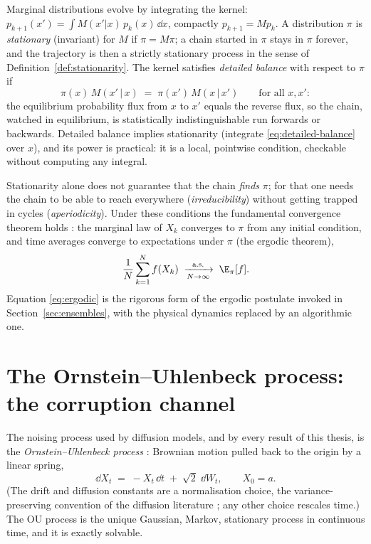 Marginal distributions evolve by integrating the kernel:
$p_{k+1}(x') = \int M(x'|x)\, p_k(x)\,\dd x$, compactly
$p_{k+1} = M p_k$. A distribution $\pi$ is \emph{stationary} (invariant)
for $M$ if $\pi = M\pi$; a chain started in $\pi$ stays in $\pi$ forever,
and the trajectory is then a strictly stationary process in the sense of
Definition~\ref{def:stationarity}. The kernel satisfies \emph{detailed
balance} with respect to $\pi$ if
\begin{equation}
  \pi(x)\, M(x' \,|\, x) \;=\; \pi(x')\, M(x \,|\, x')
  \qquad \text{for all } x, x' :
  \label{eq:detailed-balance}
\end{equation}
the equilibrium probability flux from $x$ to $x'$ equals the reverse
flux, so the chain, watched in equilibrium, is statistically
indistinguishable run forwards or backwards. Detailed balance implies
stationarity (integrate \eqref{eq:detailed-balance} over $x$), and its
power is practical: it is a local, pointwise condition, checkable without
computing any integral.

Stationarity alone does not guarantee that the chain \emph{finds} $\pi$;
for that one needs the chain to be able to reach everywhere
(\emph{irreducibility}) without getting trapped in cycles
(\emph{aperiodicity}). Under these conditions the fundamental convergence
theorem holds \citep{robert2004monte}: the marginal law of $X_k$
converges to $\pi$ from any initial condition, and time averages converge
to expectations under $\pi$ (the ergodic theorem),
\begin{equation}
  \frac{1}{N} \sum_{k=1}^{N} f(X_k)
  \;\xrightarrow[N \to \infty]{\text{a.s.}}\;
  \E_\pi[f] .
  \label{eq:ergodic}
\end{equation}
Equation \eqref{eq:ergodic} is the rigorous form of the ergodic postulate
invoked in Section~\ref{sec:ensembles}, with the physical dynamics
replaced by an algorithmic one.

\section{The Ornstein--Uhlenbeck process: the corruption channel}
\label{sec:ou}

The noising process used by diffusion models, and by every result of this
thesis, is the \emph{Ornstein--Uhlenbeck process}
\citep{uhlenbeck1930theory}: Brownian motion pulled back to the origin by
a linear spring,
\begin{equation}
  \dd X_t \;=\; -X_t\,\dd t \;+\; \sqrt{2}\;\dd W_t ,
  \qquad X_0 = a .
  \label{eq:ou-sde}
\end{equation}
(The drift and diffusion constants are a normalisation choice, the
variance-preserving convention of the diffusion literature
\citep{song2021scorebased}; any other choice rescales time.) The OU
process is the unique Gaussian, Markov, stationary process in continuous
time, and it is exactly solvable.

